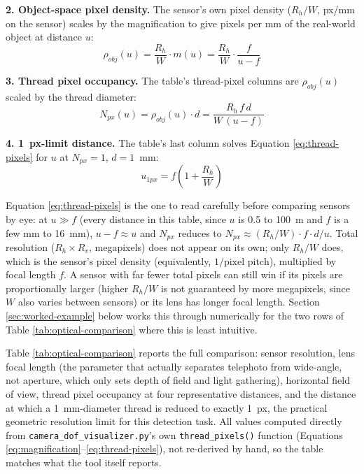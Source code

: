 \textbf{2. Object-space pixel density.} The sensor's own pixel density ($R_h/W$, px/mm on the sensor) scales by the magnification to give pixels per mm of the real-world object at distance $u$:
\begin{equation}
\rho_{obj}(u) = \frac{R_h}{W} \cdot m(u) = \frac{R_h}{W} \cdot \frac{f}{u - f}
\label{eq:pixel-density}
\end{equation}

\textbf{3. Thread pixel occupancy.} The table's thread-pixel columns are $\rho_{obj}(u)$ scaled by the thread diameter:
\begin{equation}
N_{px}(u) = \rho_{obj}(u) \cdot d = \frac{R_h \, f \, d}{W \,(u - f)}
\label{eq:thread-pixels}
\end{equation}

\textbf{4. 1~px-limit distance.} The table's last column solves Equation \ref{eq:thread-pixels} for $u$ at $N_{px} = 1$, $d = 1$~mm:
\begin{equation}
u_{1px} = f\left(1 + \frac{R_h}{W}\right)
\label{eq:1px-limit}
\end{equation}

Equation \ref{eq:thread-pixels} is the one to read carefully before comparing sensors by eye: at $u \gg f$ (every distance in this table, since $u$ is 0.5 to 100~m and $f$ is a few mm to 16~mm), $u - f \approx u$ and $N_{px}$ reduces to $N_{px} \approx (R_h/W) \cdot f \cdot d / u$. Total resolution ($R_h \times R_v$, megapixels) does not appear on its own; only $R_h/W$ does, which is the sensor's pixel density (equivalently, $1/\text{pixel pitch}$), multiplied by focal length $f$. A sensor with far fewer total pixels can still win if its pixels are proportionally larger (higher $R_h/W$ is not guaranteed by more megapixels, since $W$ also varies between sensors) or its lens has longer focal length. Section \ref{sec:worked-example} below works this through numerically for the two rows of Table \ref{tab:optical-comparison} where this is least intuitive.

Table \ref{tab:optical-comparison} reports the full comparison: sensor resolution, lens focal length (the parameter that actually separates telephoto from wide-angle, not aperture, which only sets depth of field and light gathering), horizontal field of view, thread pixel occupancy at four representative distances, and the distance at which a 1~mm-diameter thread is reduced to exactly 1~px, the practical geometric resolution limit for this detection task. All values computed directly from \texttt{camera\_dof\_visualizer.py}'s own \texttt{thread\_pixels()} function (Equations \ref{eq:magnification}--\ref{eq:thread-pixels}), not re-derived by hand, so the table matches what the tool itself reports.

